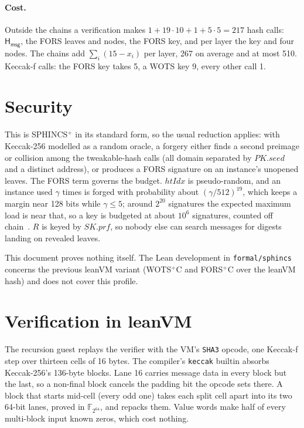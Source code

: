 \documentclass[11pt]{article}
\newcommand{\Hmsg}{\mathsf{H_{msg}}}
\newcommand{\seed}{\mathit{PK.seed}}
\newcommand{\skprf}{\mathit{SK.prf}}
\newcommand{\htidx}{\mathit{htIdx}}
\begin{document}
\paragraph{Cost.} Outside the chains a verification makes $1+19\cdot10+1+5\cdot5=217$ hash calls: $\Hmsg$, the FORS leaves and nodes, the FORS key, and per layer the key and four nodes. The chains add $\sum_i(15-x_i)$ per layer, 267 on average and at most 510. Keccak-f calls: the FORS key takes 5, a WOTS key 9, every other call 1.

\section{Security}
\label{sec:security}

This is SPHINCS$^+$ in its standard form, so the usual reduction applies: with
Keccak-256 modelled as a random oracle, a forgery either finds a second preimage or
collision among the tweakable-hash calls (all domain separated by $\seed$ and a
distinct address), or produces a FORS signature on an instance's unopened leaves.
The FORS term governs the budget. $\htidx$ is pseudo-random, and an instance used
$\gamma$ times is forged with probability about $(\gamma/512)^{19}$, which keeps a
margin near 128 bits while $\gamma\leq5$; around $2^{20}$ signatures the expected
maximum load is near that, so a key is budgeted at about $10^6$ signatures, counted
off chain~\cite{NICETRYDOCS}. $R$ is keyed by $\skprf$, so nobody else can search
messages for digests landing on revealed leaves.

This document proves nothing itself. The Lean development in \texttt{formal/sphincs}
concerns the previous leanVM variant (WOTS$^+$C and FORS$^+$C over the leanVM hash) and
does not cover this profile.

\section{Verification in leanVM}
\label{sec:vm}

The recursion guest replays the verifier with the VM's \texttt{SHA3} opcode, one
Keccak-f step over thirteen cells of 16 bytes. The compiler's \texttt{keccak} builtin
absorbs Keccak-256's 136-byte blocks. Lane 16 carries message data in every block but
the last, so a non-final block cancels the padding bit the opcode sets there. A
block that starts mid-cell (every odd one) takes each split cell apart into its two
64-bit lanes, proved in $\mathbb F_{2^{64}}$, and repacks them. Value words make half of every
multi-block input known zeros, which cost nothing.
\end{document}
